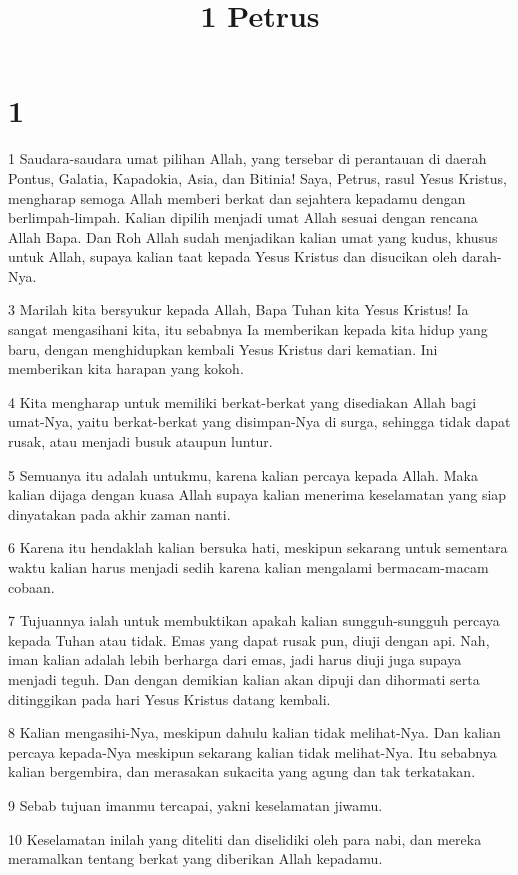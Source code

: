 

\title{1 Petrus}


\chapter{1}

\par 1 Saudara-saudara umat pilihan Allah, yang tersebar di perantauan di daerah Pontus, Galatia, Kapadokia, Asia, dan Bitinia! Saya, Petrus, rasul Yesus Kristus, mengharap semoga Allah memberi berkat dan sejahtera kepadamu dengan berlimpah-limpah. Kalian dipilih menjadi umat Allah sesuai dengan rencana Allah Bapa. Dan Roh Allah sudah menjadikan kalian umat yang kudus, khusus untuk Allah, supaya kalian taat kepada Yesus Kristus dan disucikan oleh darah-Nya.
\par 3 Marilah kita bersyukur kepada Allah, Bapa Tuhan kita Yesus Kristus! Ia sangat mengasihani kita, itu sebabnya Ia memberikan kepada kita hidup yang baru, dengan menghidupkan kembali Yesus Kristus dari kematian. Ini memberikan kita harapan yang kokoh.
\par 4 Kita mengharap untuk memiliki berkat-berkat yang disediakan Allah bagi umat-Nya, yaitu berkat-berkat yang disimpan-Nya di surga, sehingga tidak dapat rusak, atau menjadi busuk ataupun luntur.
\par 5 Semuanya itu adalah untukmu, karena kalian percaya kepada Allah. Maka kalian dijaga dengan kuasa Allah supaya kalian menerima keselamatan yang siap dinyatakan pada akhir zaman nanti.
\par 6 Karena itu hendaklah kalian bersuka hati, meskipun sekarang untuk sementara waktu kalian harus menjadi sedih karena kalian mengalami bermacam-macam cobaan.
\par 7 Tujuannya ialah untuk membuktikan apakah kalian sungguh-sungguh percaya kepada Tuhan atau tidak. Emas yang dapat rusak pun, diuji dengan api. Nah, iman kalian adalah lebih berharga dari emas, jadi harus diuji juga supaya menjadi teguh. Dan dengan demikian kalian akan dipuji dan dihormati serta ditinggikan pada hari Yesus Kristus datang kembali.
\par 8 Kalian mengasihi-Nya, meskipun dahulu kalian tidak melihat-Nya. Dan kalian percaya kepada-Nya meskipun sekarang kalian tidak melihat-Nya. Itu sebabnya kalian bergembira, dan merasakan sukacita yang agung dan tak terkatakan.
\par 9 Sebab tujuan imanmu tercapai, yakni keselamatan jiwamu.
\par 10 Keselamatan inilah yang diteliti dan diselidiki oleh para nabi, dan mereka meramalkan tentang berkat yang diberikan Allah kepadamu.
